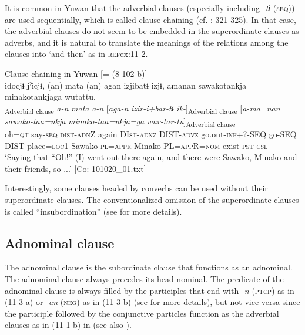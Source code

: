 It is common in Yuwan that the adverbial clauses (especially including \textit{{}-tɨ} (\textsc{seq})) are used sequentially, which is called clause-chaining (cf. \citealt{Payne1997}: 321-325). In that case, the adverbial clauses do not seem to be embedded in the superordinate clauses as adverbs, and it is natural to translate the meanings of the relations among the clauses into ‘and then’ as in \textsc{ref}{ex:11-2}.

\ea\label{ex:11-2}  Clause-chaining in Yuwan [= (8-102 b)]\\
    \glll idocjɨ  jˀicjɨ,  (an)  mata  (an)  agan izjibatɨ  izjɨ,  amanan  sawakotankja minakotankjaga  wutattu,\\
    [\textit{ido=ccjɨ}  \textit{jˀ-\Highlight{tɨ}}]\textsubscript{Adverbial clause}  \textit{a-n}  \textit{mata}  \textit{a-n}  [\textit{aga-n} \textit{izir-i+bar-tɨ}  \textit{ik-}]\textsubscript{Adverbial clause}\textbf{  }[\textit{a-ma=nan}  \textit{sawako-taa=nkja}  \textit{minako-taa=nkja=ga}  \textit{wur-tar-tu}]\textsubscript{Adverbial clause}\\
    oh=\textsc{qt}  say-\textsc{seq}  \textsc{dist}-\textsc{adn}Z  again  DI\textsc{st}-\textsc{adnz}  DIST-\textsc{advz} go.out-\textsc{inf}+?-SEQ  go-SEQ  DIST-place=\textsc{loc}1  Sawako-\textsc{pl}=\textsc{appr} Minako-PL=\textsc{app}R=\textsc{nom}  exist-\textsc{pst}-\textsc{csl}\\
    \glt ‘Saying that “Oh!” (I) went out there again, and there were Sawako, Minako and their friends, so ...’ [Co: 101020\_01.txt]
\z

Interestingly, some clauses headed by converbs can be used without their superordinate clauses. The conventionalized omission of the superordinate clauses is called “insubordination” (see  for more details).

\subsection{Adnominal clause}\label{sec:11.1.2}

The adnominal clause is the subordinate clause that functions as an adnominal. The adnominal clause always precedes its head nominal. The predicate of the adnominal clause is always filled by the participles that end with \textit{{}-n} (\textsc{ptcp}) as in (11-3 a) or \textit{{}-an} (\textsc{neg}) as in (11-3 b) (see  for more details), but not vice versa since the participle followed by the conjunctive particles function as the adverbial clauses as in (11-1 b) in  (see also ).

